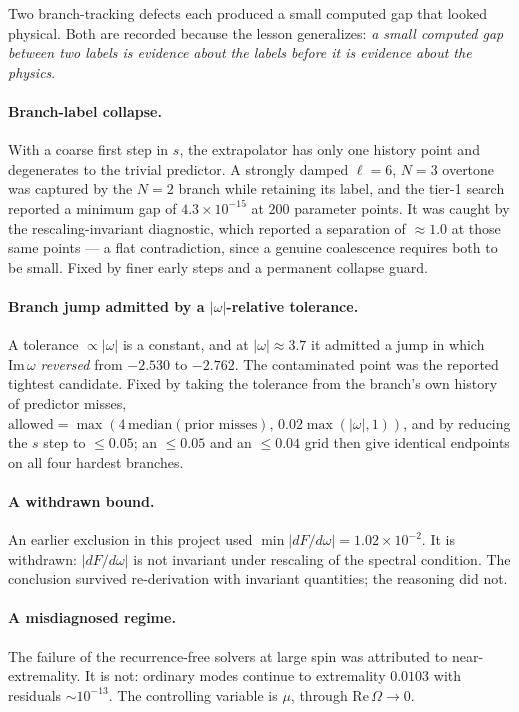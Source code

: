\documentclass[aps,prd,onecolumn,superscriptaddress,nofootinbib]{revtex4-2}
\newcommand{\Rem}{\mathrm{Re}}
\newcommand{\Imm}{\mathrm{Im}}
\begin{document}
Two branch-tracking defects each produced a small computed gap that looked
physical. Both are recorded because the lesson generalizes: \emph{a small
computed gap between two labels is evidence about the labels before it is
evidence about the physics}.

\paragraph*{Branch-label collapse.} With a coarse first step in $s$, the
extrapolator has only one history point and degenerates to the trivial
predictor. A strongly damped $\ell=6$, $N=3$ overtone was captured by the $N=2$
branch while retaining its label, and the tier-1 search reported a minimum gap
of $4.3\times10^{-15}$ at $200$ parameter points. It was caught by the
rescaling-invariant diagnostic, which reported a separation of $\approx1.0$ at
those same points --- a flat contradiction, since a genuine coalescence requires
both to be small. Fixed by finer early steps and a permanent collapse guard.

\paragraph*{Branch jump admitted by a $|\omega|$-relative tolerance.} A
tolerance $\propto|\omega|$ is a constant, and at $|\omega|\approx3.7$ it
admitted a jump in which $\Imm\,\omega$ \emph{reversed} from $-2.530$ to
$-2.762$. The contaminated point was the reported tightest candidate. Fixed by
taking the tolerance from the branch's own history of predictor misses,
$\text{allowed}=\max(4\,\mathrm{median}(\text{prior misses}),\,
0.02\max(|\omega|,1))$, and by reducing the $s$ step to $\le0.05$; an
$\le0.05$ and an $\le0.04$ grid then give identical endpoints on all four
hardest branches.

\paragraph*{A withdrawn bound.} An earlier exclusion in this project used
$\min|dF/d\omega|=1.02\times10^{-2}$. It is withdrawn: $|dF/d\omega|$ is not
invariant under rescaling of the spectral condition. The conclusion survived
re-derivation with invariant quantities; the reasoning did not.

\paragraph*{A misdiagnosed regime.} The failure of the recurrence-free solvers
at large spin was attributed to near-extremality. It is not: ordinary modes
continue to extremality $0.0103$ with residuals $\sim10^{-13}$. The controlling
variable is $\mu$, through $\Rem\,\Omega\to0$.
\end{document}
